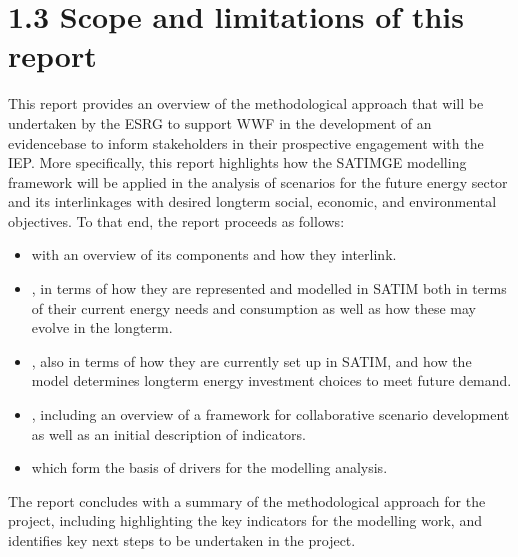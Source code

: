 \documentclass[letterpaper,10pt,english]{jupyterBook}
\begin{document}
\section{1.3 Scope and limitations of this report}
\label{\detokenize{01Introduction:scope-and-limitations-of-this-report}}
\sphinxAtStartPar
This report provides an overview of the methodological approach that will be undertaken by the ESRG to support WWF in the development of an evidence\sphinxhyphen{}base to inform stakeholders in their prospective engagement with the IEP. More specifically, this report highlights how the SATIMGE modelling framework will be applied in the analysis of scenarios for the future energy sector and its interlinkages with desired long\sphinxhyphen{}term social, economic, and environmental objectives. To that end, the report proceeds as follows:
\begin{itemize}
\item {} 
\sphinxAtStartPar
{} with an overview of its components and how they interlink.

\item {} 
\sphinxAtStartPar
{}, in terms of how they are represented and modelled in SATIM both in terms of their current energy needs and consumption as well as how these may evolve in the long\sphinxhyphen{}term.

\item {} 
\sphinxAtStartPar
{}, also in terms of how they are currently set up in SATIM, and how the model determines long\sphinxhyphen{}term energy investment choices to meet future demand.

\item {} 
\sphinxAtStartPar
{}, including an overview of a framework for collaborative scenario development as well as an initial description of indicators.

\item {} 
\sphinxAtStartPar
{} which form the basis of drivers for the modelling analysis.

\end{itemize}

\sphinxAtStartPar
The report concludes with a summary of the methodological approach for the project, including highlighting the key indicators for the modelling work, and identifies key next steps to be undertaken in the project.
\end{document}

